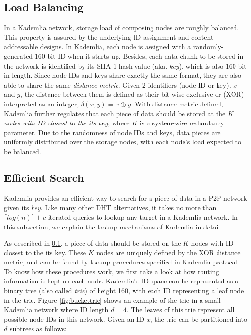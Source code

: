 \subsection{Load Balancing}
\label{ss:loadbalancing}
In a Kademlia network, storage load of composing nodes are roughly balanced. This property is assured by the underlying ID assignment and content-addressable designs. In Kademlia, each node is assigned with a randomly-generated 160-bit ID when it starts up. Besides, each data chunk to be stored in the network is identified by its SHA-1 hash value (aka. \textit{key}), which is also 160 bit in length. Since node IDs and keys share exactly the same format, they are also able to share the same \textit{distance metric}. Given 2 identifiers (node ID or key), $x$ and $y$, the distance between them is defined as their bit-wise exclusive or (XOR) interpreted as an integer, $\delta(x,y)=x \oplus y$. With distance metric defined, Kademlia further regulates that each piece of data should be stored at the \textit{$K$ nodes with ID closest to the its key}, where $K$ is a system-wise redundancy parameter. Due to the randomness of node IDs and keys, data pieces are uniformly distributed over the storage nodes, with each node's load expected to be balanced.

\subsection{Efficient Search}
\label{ss:efficientsearch}

Kademlia provides an efficient way to search for a piece of data in a P2P network given its \textit{key}. Like many other DHT alternatives, it takes no more than $\lceil log(n) \rceil + c$ iterated queries to lookup any target in a Kademlia network. In this subsection, we explain the lookup mechanisms of Kademlia in detail.

As described in \ref{ss:loadbalancing}, a piece of data should be stored on the $K$ nodes with ID closest to the its key. These $K$ nodes are uniquely defined by the XOR distance metric, and can be found by lookup procedures specified in Kademlia protocol. To know how these procedures work, we first take a look at how routing information is kept on each node. Kademlia's ID space can be represented as a binary tree (also called \textit{trie}) of height 160, with each ID representing a leaf node in the trie. Figure \ref{fig:buckettrie} shows an example of the trie in a small Kademlia network where ID length $d = 4$. The leaves of this trie represent all possible node IDs in this network. Given an ID $x$, the trie can be partitioned into $d$ subtrees as follows:


